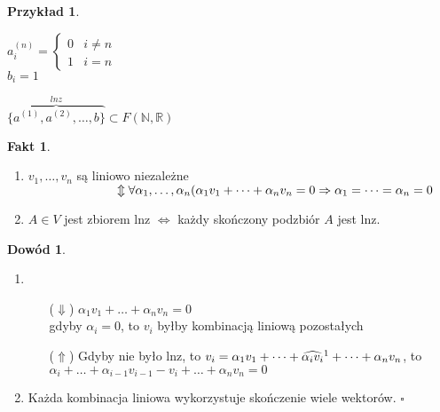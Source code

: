 \documentclass[12pt,a4paper]{article}
\newcommand{\RR}{\mathbb{R}}
\renewcommand{\qed}{$\square$}
\theoremstyle{plain}
\theoremstyle{definition}
\newtheorem{ft}{Fakt}[section]
\theoremstyle{definition}
\theoremstyle{definition}
\theoremstyle{definition}
\newtheorem*{dd}{Dowód}
\theoremstyle{definition}
\newtheorem*{prz}{Przykład}
\theoremstyle{definition}
\theoremstyle{definition}
\begin{document}
\begin{prz}
    ~\\
    \begin{minipage}[t]{0.5\textwidth}
    $
    a^{(n)}_i = \begin{cases}
                0 & i \neq n \\ 
                1 & i = n
              \end{cases}
    $ \\
    $b_i = 1$
    \end{minipage}%
    \begin{minipage}[t]{0.5\textwidth}
       $\overbrace{\{a^{(1)},a^{(2)},\dots,b\}}^{lnz} \subset F(\mathbb{N},\RR)$
        
    \end{minipage}
\end{prz}

\newpage

\begin{ft} \hfill
    \begin{enumerate}[{(}1{)}]
         \item $v_1,\dots,v_n$ są liniowo niezależne \\
        $ \hspace*{25mm} \Updownarrow 
        \\ 
        \forall \alpha_1,\dots,\alpha_n(\alpha_1v_1+\dots+\alpha_nv_n = 0 \Rightarrow \alpha_1 = \dots = \alpha_n =0$ 
        \item $A \in V $ jest zbiorem lnz $\iff$ każdy skończony podzbiór $A$ jest lnz.
    \end{enumerate}
\end{ft}

\begin{dd} \hfill 
    \begin{enumerate}[{(}1{)}]
        \item \begin{itemize}
            \item[($\Downarrow$)] $\alpha_1v_1 + \dots + \alpha_nv_n = 0$ \\
                gdyby $\alpha_i = 0 $, to $v_i$ byłby kombinacją liniową pozostałych \lightning
            \item[($\Uparrow$)] Gdyby nie było lnz, to $v_i = \alpha_1v_1+\dots+ \widehat{\alpha_i v_i} \text{\footnotemark} +\dots + \alpha_nv_n$, to \\ $\alpha_i + \dots + \alpha_{i-1}v_{i-1} - v_i + \dots + \alpha_nv_n = 0 $ \lightning
        \end{itemize}
        \item Każda kombinacja liniowa wykorzystuje skończenie wiele wektorów. \qed
    \end{enumerate}
\end{dd} 

{\color{white} $\widehat{}$} %
\end{document}
